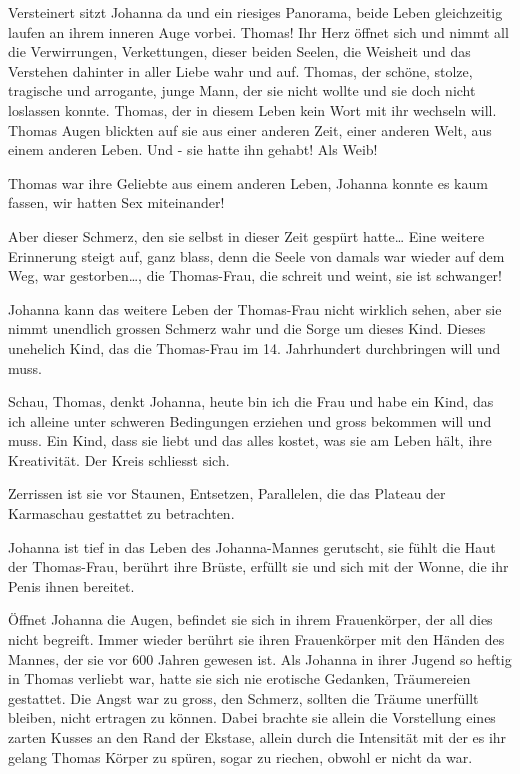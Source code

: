 \documentclass[10pt,titlepage,a5paper]{book}
\begin{document}
Versteinert sitzt Johanna da und ein riesiges Panorama, beide Leben gleichzeitig laufen an ihrem inneren Auge vorbei. Thomas! Ihr Herz öffnet sich und nimmt all die Verwirrungen, Verkettungen, dieser beiden Seelen, die Weisheit und das Verstehen dahinter in aller Liebe  wahr und auf.
Thomas, der schöne, stolze, tragische und arrogante, junge Mann, der sie nicht wollte und sie doch nicht loslassen konnte. Thomas, der in diesem Leben kein Wort mit ihr wechseln will. Thomas Augen blickten auf sie aus einer anderen Zeit, einer anderen Welt, aus einem anderen Leben.
Und - sie hatte ihn gehabt! Als Weib!

Thomas war ihre Geliebte aus einem anderen Leben, Johanna konnte es kaum fassen, wir hatten Sex miteinander!

Aber dieser Schmerz, den sie selbst in dieser Zeit gespürt hatte\dots 
Eine weitere Erinnerung steigt auf, ganz blass, denn die Seele von damals war wieder auf dem Weg, war gestorben\dots , die Thomas-Frau, die schreit und weint, sie ist schwanger!

Johanna kann das weitere Leben der Thomas-Frau nicht wirklich sehen, aber sie nimmt unendlich grossen Schmerz wahr und die Sorge um dieses Kind. Dieses unehelich Kind, das die Thomas-Frau im 14. Jahrhundert durchbringen will und muss.

Schau, Thomas, denkt Johanna, heute bin ich die Frau und habe ein Kind, das ich alleine unter schweren Bedingungen erziehen und gross bekommen will und  muss. Ein Kind, dass sie liebt und das alles kostet, was sie am Leben hält, ihre Kreativität. Der Kreis schliesst sich.

Zerrissen ist sie vor Staunen, Entsetzen, Parallelen, die das Plateau der Karmaschau gestattet zu betrachten.

Johanna ist tief in das Leben des Johanna-Mannes gerutscht, sie fühlt die Haut der Thomas-Frau, berührt ihre Brüste, erfüllt sie und sich mit der Wonne, die ihr Penis ihnen bereitet.

Öffnet Johanna die Augen, befindet sie sich in ihrem Frauenkörper, der all dies nicht begreift. Immer wieder berührt sie ihren Frauenkörper mit den Händen des Mannes, der sie vor 600 Jahren gewesen ist. Als Johanna in ihrer Jugend so heftig in Thomas verliebt war, hatte sie sich nie erotische Gedanken, Träumereien gestattet. Die Angst war zu gross, den Schmerz, sollten die Träume unerfüllt bleiben, nicht ertragen zu können. Dabei brachte sie allein die Vorstellung eines zarten Kusses an den Rand der Ekstase, allein durch die Intensität mit der es ihr gelang Thomas Körper zu spüren, sogar zu riechen, obwohl er nicht da war.
\end{document}

